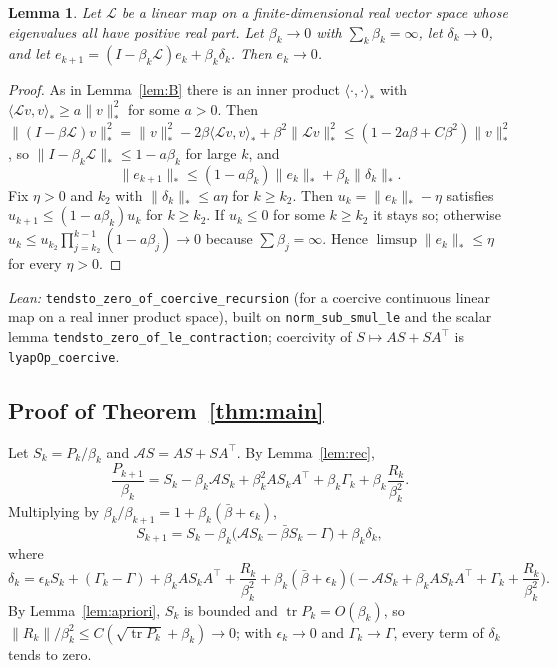 \documentclass[11pt]{article}
\newtheorem{lemma}[theorem]{Lemma}
\theoremstyle{definition}
\theoremstyle{remark}
\newcommand{\Lop}{\mathcal{L}}
\DeclareMathOperator{\tr}{tr}
\begin{document}
\begin{lemma}\label{lem:pert}
Let $\Lop$ be a linear map on a finite-dimensional real vector space whose
eigenvalues all have positive real part. Let $\beta_k \to 0$ with $\sum_k\beta_k = \infty$,
let $\delta_k \to 0$, and let $e_{k+1} = (I - \beta_k\Lop)e_k + \beta_k\delta_k$. Then $e_k \to 0$.
\end{lemma}
\begin{proof}
As in Lemma~\ref{lem:B} there is an inner product $\langle\cdot,\cdot\rangle_*$ with
$\langle\Lop v, v\rangle_* \ge a\|v\|_*^2$ for some $a > 0$. Then
$\|(I - \beta\Lop)v\|_*^2 = \|v\|_*^2 - 2\beta\langle\Lop v, v\rangle_* + \beta^2\|\Lop v\|_*^2
\le (1 - 2a\beta + C\beta^2)\|v\|_*^2$, so $\|I - \beta_k\Lop\|_* \le 1 - a\beta_k$ for large $k$, and
\[
  \|e_{k+1}\|_* \le (1 - a\beta_k)\|e_k\|_* + \beta_k\|\delta_k\|_* .
\]
Fix $\eta > 0$ and $k_2$ with $\|\delta_k\|_* \le a\eta$ for $k \ge k_2$. Then
$u_k = \|e_k\|_* - \eta$ satisfies $u_{k+1} \le (1 - a\beta_k)u_k$ for $k\ge k_2$. If
$u_k \le 0$ for some $k \ge k_2$ it stays so; otherwise
$u_k \le u_{k_2}\prod_{j=k_2}^{k-1}(1 - a\beta_j) \to 0$ because $\sum\beta_j = \infty$.
Hence $\limsup\|e_k\|_* \le \eta$ for every $\eta > 0$.
\end{proof}
\noindent\emph{Lean:} \texttt{tendsto\_zero\_of\_coercive\_recursion} (for a coercive
continuous linear map on a real inner product space), built on
\texttt{norm\_sub\_smul\_le} and the scalar lemma \texttt{tendsto\_zero\_of\_le\_contraction};
coercivity of $S \mapsto AS + SA^\top$ is \texttt{lyapOp\_coercive}.

\subsection{Proof of Theorem~\ref{thm:main}}

Let $S_k = P_k/\beta_k$ and $\mathcal A S = AS + SA^\top$. By Lemma~\ref{lem:rec},
\[
  \frac{P_{k+1}}{\beta_k} = S_k - \beta_k\mathcal AS_k + \beta_k^2AS_kA^\top
    + \beta_k\Gamma_k + \beta_k\frac{R_k}{\beta_k^2}.
\]
Multiplying by $\beta_k/\beta_{k+1} = 1 + \beta_k(\bar\beta + \epsilon_k)$,
\[
  S_{k+1} = S_k - \beta_k\big(\mathcal AS_k - \bar\beta S_k - \Gamma\big) + \beta_k\delta_k,
\]
where
\[
  \delta_k = \epsilon_kS_k + (\Gamma_k - \Gamma) + \beta_kAS_kA^\top + \frac{R_k}{\beta_k^2}
    + \beta_k(\bar\beta + \epsilon_k)\Big(-\mathcal AS_k + \beta_kAS_kA^\top + \Gamma_k + \frac{R_k}{\beta_k^2}\Big).
\]
By Lemma~\ref{lem:apriori}, $S_k$ is bounded and $\tr P_k = O(\beta_k)$, so
$\|R_k\|/\beta_k^2 \le C(\sqrt{\tr P_k} + \beta_k) \to 0$; with $\epsilon_k \to 0$ and
$\Gamma_k \to \Gamma$, every term of $\delta_k$ tends to zero.
\end{document}
